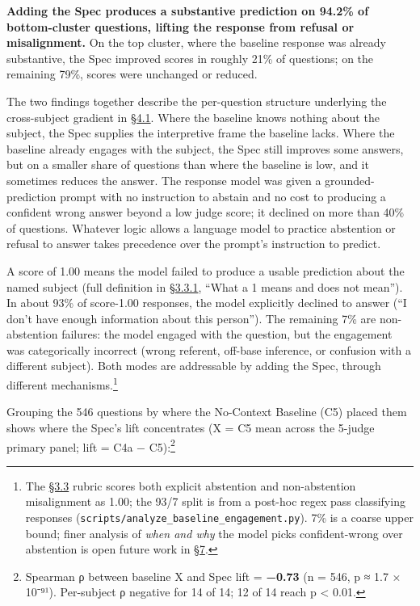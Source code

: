 \textbf{Adding the Spec produces a substantive prediction on 94.2\% of
bottom-cluster questions, lifting the response from refusal or
misalignment.} On the top cluster, where the baseline response was
already substantive, the Spec improved scores in roughly 21\% of
questions; on the remaining 79\%, scores were unchanged or reduced.

The two findings together describe the per-question structure underlying
the cross-subject gradient in \hyperref[the-cross-subject-gradient-and-its-per-question-mechanism]{§4.1}. Where the baseline knows nothing
about the subject, the Spec supplies the interpretive frame the baseline
lacks. Where the baseline already engages with the subject, the Spec
still improves some answers, but on a smaller share of questions than
where the baseline is low, and it sometimes reduces the answer. The
response model was given a grounded-prediction prompt with no
instruction to abstain and no cost to producing a confident wrong answer
beyond a low judge score; it declined on more than 40\% of questions.
Whatever logic allows a language model to practice abstention or refusal
to answer takes precedence over the prompt's instruction to predict.

A score of 1.00 means the model failed to produce a usable prediction
about the named subject (full definition in \hyperref[score-interpretation]{§3.3.1}, ``What a 1 means and
does not mean''). In about 93\% of score-1.00 responses, the model
explicitly declined to answer (``I don't have enough information about
this person''). The remaining 7\% are non-abstention failures: the model
engaged with the question, but the engagement was categorically
incorrect (wrong referent, off-base inference, or confusion with a
different subject). Both modes are addressable by adding the Spec,
through different mechanisms.\footnote{The \hyperref[scoring-rubric-with-calibrated-llm-judge-panel]{§3.3} rubric scores both
  explicit abstention and non-abstention misalignment as 1.00; the 93/7
  split is from a post-hoc regex pass classifying responses
  (\texttt{scripts/analyze\_baseline\_engagement.py}). 7\% is a coarse
  upper bound; finer analysis of \emph{when and why} the model picks
  confident-wrong over abstention is open future work in \hyperref[future-work]{§7}.}

Grouping the 546 questions by where the No-Context Baseline (C5) placed
them shows where the Spec's lift concentrates (X = C5 mean across the
5-judge primary panel; lift = C4a − C5):\footnote{Spearman ρ between
  baseline X and Spec lift = \textbf{−0.73} (n = 546, p ≈ 1.7 × 10⁻⁹¹).
  Per-subject ρ negative for 14 of 14; 12 of 14 reach p \textless{}
  0.01.}

